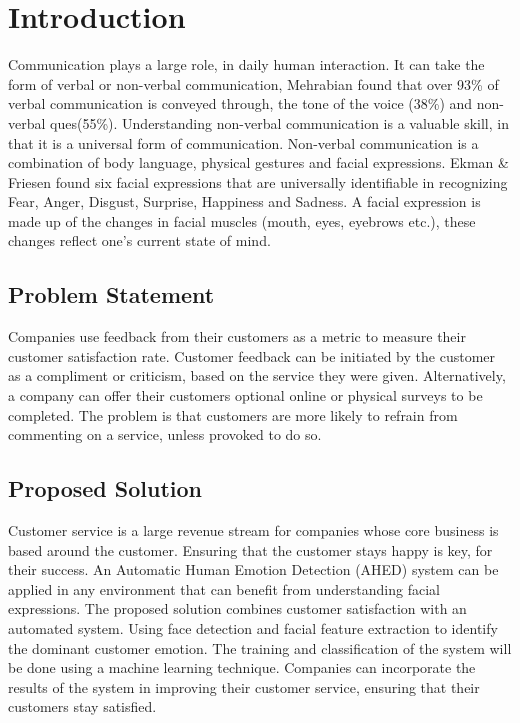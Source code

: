 ﻿
\chapter{Introduction}


Communication plays a large role, in daily human interaction. It can take the form of verbal or non-verbal communication, Mehrabian found that over 93\% of verbal communication is conveyed through, the tone of the voice (38\%) and non-verbal ques(55\%)\cite{mehrabian}. Understanding non-verbal communication is a valuable skill, in that it is a universal form of communication. 
Non-verbal communication is a combination of body language, physical gestures and facial expressions. Ekman \& Friesen found six facial expressions that are universally identifiable in recognizing Fear, Anger, Disgust, Surprise, Happiness and Sadness\cite{ekman}. A facial expression is made up of the changes in facial muscles (mouth, eyes, eyebrows etc.), these changes reflect one’s current state of mind. 

\section{Problem Statement}
Companies use feedback from their customers as a metric to measure their customer satisfaction rate. Customer feedback can be initiated by the customer as a compliment or criticism, based on the service they were given. Alternatively, a company can offer their customers optional online or physical surveys to be completed. The problem is that customers are more likely to refrain from commenting on a service, unless provoked to do so.

\section{Proposed Solution}
Customer service is a large revenue stream for companies whose core business is based around the customer. Ensuring that the customer stays happy is key, for their success. An Automatic Human Emotion Detection (AHED) system can be applied in any environment that can benefit from understanding facial expressions.
The proposed solution combines customer satisfaction with an automated system. Using face detection and facial feature extraction to identify the dominant customer emotion. The training and classification of the system will be done using a machine learning technique. Companies can incorporate the results of the system in improving their customer service, ensuring that their customers stay satisfied.


